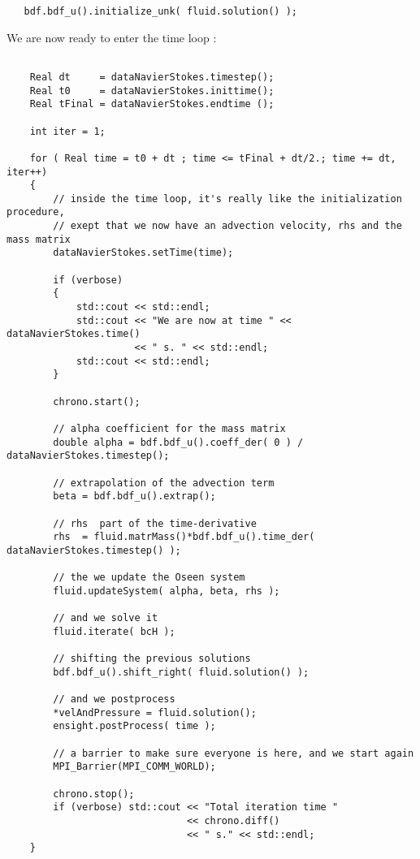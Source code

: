 \begin{verbatim}
   bdf.bdf_u().initialize_unk( fluid.solution() );
\end{verbatim}

We are now ready to enter the time loop :

\begin{verbatim}

    Real dt     = dataNavierStokes.timestep();
    Real t0     = dataNavierStokes.inittime();
    Real tFinal = dataNavierStokes.endtime ();

    int iter = 1;

    for ( Real time = t0 + dt ; time <= tFinal + dt/2.; time += dt, iter++)
    {
        // inside the time loop, it's really like the initialization procedure,
        // exept that we now have an advection velocity, rhs and the mass matrix
        dataNavierStokes.setTime(time);

        if (verbose)
        {
            std::cout << std::endl;
            std::cout << "We are now at time " << dataNavierStokes.time()
                      << " s. " << std::endl;
            std::cout << std::endl;
        }

        chrono.start();

        // alpha coefficient for the mass matrix
        double alpha = bdf.bdf_u().coeff_der( 0 ) / dataNavierStokes.timestep();

        // extrapolation of the advection term
        beta = bdf.bdf_u().extrap();

        // rhs  part of the time-derivative
        rhs  = fluid.matrMass()*bdf.bdf_u().time_der( dataNavierStokes.timestep() );

        // the we update the Oseen system
        fluid.updateSystem( alpha, beta, rhs );

        // and we solve it
        fluid.iterate( bcH );

        // shifting the previous solutions
        bdf.bdf_u().shift_right( fluid.solution() );

        // and we postprocess
        *velAndPressure = fluid.solution();
        ensight.postProcess( time );

        // a barrier to make sure everyone is here, and we start again
        MPI_Barrier(MPI_COMM_WORLD);

        chrono.stop();
        if (verbose) std::cout << "Total iteration time "
                               << chrono.diff()
                               << " s." << std::endl;
    }

\end{verbatim}


